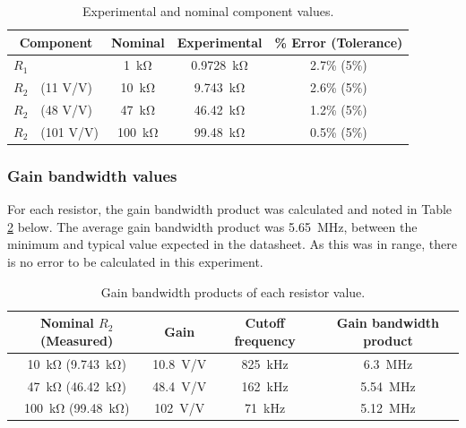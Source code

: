 \documentclass{report}
\begin{document}
\begin{table}[h]
	\centering
	\caption{Experimental and nominal component values.}
	\label{table:exp1components}
	\begin{threeparttable}
		\begin{tabular}{clccc}
			\toprule
			\multicolumn{2}{c}{Component} & Nominal & Experimental & \% Error (Tolerance) \\
			\midrule
			$R_1$ & & \SI{1}{\kohm} & \SI{0.9728}{\kohm} & 2.7\% (5\%) \\
			$R_2$ & (11 V/V) & \SI{10}{\kohm} & \SI{9.743}{\kohm} & 2.6\% (5\%)\\
			$R_2$ & (48 V/V) & \SI{47}{\kohm} & \SI{46.42}{\kohm} & 1.2\% (5\%) \\
			$R_2$ & (101 V/V) & \SI{100}{\kohm} & \SI{99.48}{\kohm} & 0.5\% (5\%) \\
			\bottomrule
		\end{tabular}
	\end{threeparttable}
\end{table}

\subsubsection{Gain bandwidth values}
For each resistor, the gain bandwidth product was calculated and noted in Table \ref{table:exp1results} below. The average gain bandwidth product was \SI{5.65}{\MHz}, between the minimum and typical value expected in the datasheet. As this was in range, there is no error to be calculated in this experiment.

\begin{table}[H]
	\centering
	\caption{Gain bandwidth products of each resistor value.}
	\label{table:exp1results}
	\begin{threeparttable}
		\begin{tabular}{cccc}
			\toprule
			Nominal $R_2$ (Measured) & Gain & Cutoff frequency & Gain bandwidth product \\
			\midrule
			\SI{10}{\kohm} (\SI{9.743}{\kohm}) & \SI{10.8}{\V/\V} & \SI{825}{\kHz} & \SI{6.3}{\MHz} \\
			\SI{47}{\kohm} (\SI{46.42}{\kohm}) & \SI{48.4}{\V/\V} & \SI{162}{\kHz} & \SI{5.54}{\MHz} \\
			\SI{100}{\kohm} (\SI{99.48}{\kohm}) & \SI{102}{\V/\V} & \SI{71}{\kHz} & \SI{5.12}{\MHz} \\
			\bottomrule
		\end{tabular}
	\end{threeparttable}
\end{table}
\end{document}

